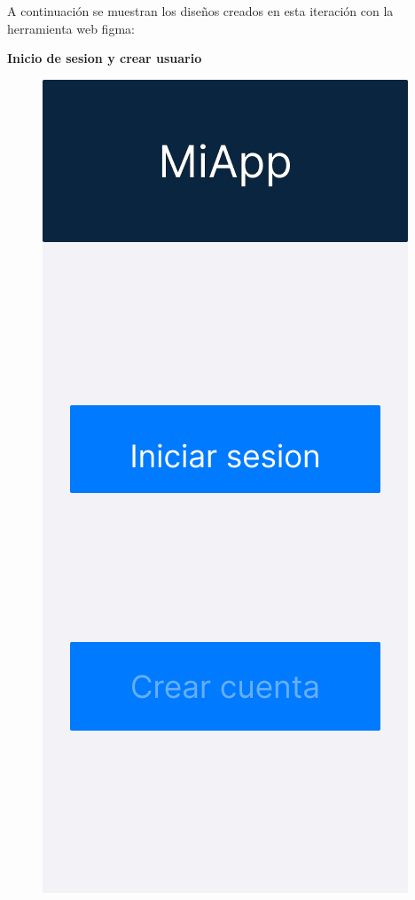 A continuación se muestran los diseños creados en esta iteración con la herramienta web figma:

\newpage

\textbf{Inicio de sesion y crear usuario}

\begin{figure}[H]
   \centering
   \begin{minipage}{0.45\textwidth}
      \centering
      \includegraphics[width=\textwidth]{fotos/Frame 22.png}

\end{minipage}
\end{figure}
